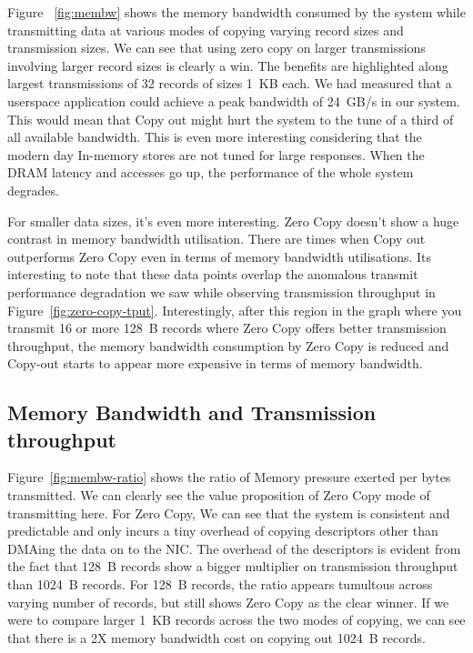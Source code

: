 

Figure ~\ref{fig:membw} shows the memory bandwidth consumed by the system while transmitting data at various modes 
of copying varying record sizes and transmission sizes. We can see that using zero copy on larger transmissions involving 
larger record sizes is clearly a win. The benefits are highlighted along largest transmissions of 32 records of sizes 1~KB each. 
 We had measured that a userspace application could achieve a peak bandwidth of 24~GB/s in our system. This would mean that Copy out 
 might hurt the system to the tune of a third of all available bandwidth. This is even more interesting considering that the modern day 
 In-memory stores are not tuned for large responses. When the DRAM latency and accesses go up, the performance of the whole system degrades.

For smaller data sizes, it's even more interesting. Zero Copy doesn't show a huge contrast in memory bandwidth utilisation. There are times 
when Copy out outperforms Zero Copy even in terms of memory bandwidth utilisations. Its interesting to note that these data points overlap the anomalous transmit performance 
degradation we saw while observing transmission throughput in Figure~\ref{fig:zero-copy-tput}. Interestingly, after this region in the graph 
where you transmit 16 or more 128~B records where Zero Copy offers better transmission throughput, the memory bandwidth consumption by Zero Copy 
is reduced and Copy-out starts to appear more expensive in terms of memory bandwidth. 

\subsection{Memory Bandwidth and Transmission throughput}

Figure~\ref{fig:membw-ratio} shows the ratio of Memory pressure exerted per bytes transmitted. We can clearly see the value proposition of 
Zero Copy mode of transmitting here. For Zero Copy, We can see that the system is consistent and predictable and only incurs a tiny overhead of 
copying descriptors other than DMAing the data on to the NIC. The overhead of the descriptors is evident from the fact that 128~B records show 
a bigger multiplier on transmission throughput than 1024~B records. For 128~B records, the ratio appears tumultous across varying number of records, 
 but still shows Zero Copy as the clear winner. If we were to compare larger 1~KB records across the two modes of copying, we can see that there is a 
 2X memory bandwidth cost on copying out 1024~B records.

